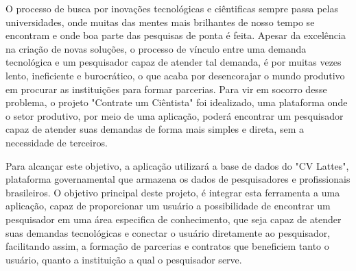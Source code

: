 \begin{resumoutfpr}
    O processo de busca por inovações tecnológicas e ciêntificas sempre passa pelas universidades, onde muitas das mentes mais brilhantes de nosso tempo se encontram e onde boa parte das pesquisas de ponta é feita. Apesar da excelência na criação de novas soluções, o processo de vínculo entre uma demanda tecnológica e um pesquisador capaz de atender tal demanda, é por muitas vezes lento, ineficiente e burocrático, o que acaba por desencorajar o mundo produtivo em procurar as instituições para formar parcerias. Para vir em socorro desse problema, o projeto "Contrate um Ciêntista" foi idealizado, uma plataforma onde o setor produtivo, por meio de uma aplicação, poderá encontrar um pesquisador capaz de atender suas demandas de forma mais simples e direta, sem a necessidade de terceiros.

    Para alcançar este objetivo, a aplicação utilizará a base de dados do "CV Lattes", plataforma governamental que armazena os dados de pesquisadores e profissionais brasileiros. O objetivo principal deste projeto, é integrar esta ferramenta a uma aplicação, capaz de proporcionar um usuário a possibilidade de encontrar um pesquisador em uma área especifica de conhecimento, que seja capaz de atender suas demandas tecnológicas e conectar o usuário diretamente ao pesquisador, facilitando assim, a formação de parcerias e contratos que beneficiem tanto o usuário, quanto a instituição a qual o pesquisador serve.
\end{resumoutfpr}
